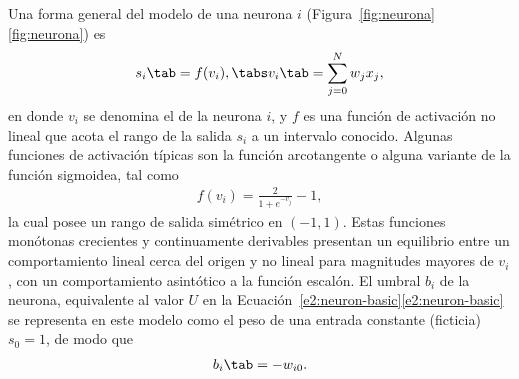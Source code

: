 Una forma general del modelo de una neurona $i$
(\iflatexml{}Figura~\ref{fig:neurona}\else\autoref{fig:neurona}\fi)
es
%
\begin{align}\label{e2:neuron-general}
  s_i \tab = f(v_i), \tabs v_i \tab = \sum_{j=0}^N w_j x_j,
\end{align}
%
en donde $v_i$ se denomina el  de la neurona
$i$, y $f$ es una función de activación no lineal que acota el rango
de la salida $s_i$ a un intervalo conocido. Algunas funciones de
activación típicas son la función arcotangente o alguna variante de la
función sigmoidea, tal como
%
\begin{align}\label{e2:sigmoid-symmetric}
  f(v_i) = \frac{2}{1+e^{-v_j}}-1,
\end{align}
%
la cual posee un rango de salida simétrico en $(-1,1)$. Estas
funciones monótonas crecientes y continuamente derivables presentan un
equilibrio entre un comportamiento lineal cerca del origen y no lineal
para magnitudes mayores de $v_i$, con un comportamiento asintótico a
la función escalón. El umbral $b_i$ de la neurona, equivalente al
valor $U$ en la
\iflatexml{}Ecuación~\ref{e2:neuron-basic}\else\autoref{e2:neuron-basic}\fi
se representa en este modelo como el peso de una entrada constante
(ficticia) $s_0=1$, de modo que
%
\begin{align}
  b_i\tab=-w_{i0}.
\end{align}
%

